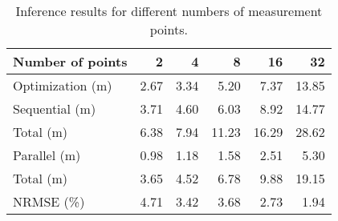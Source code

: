 \begin{table*}
  \centering
  \caption{Inference results for different numbers of measurement points.}
  \ttfamily
  \begin{tabular}{lrrrrr}
    \toprule
    \textnormal{Number of points} &    2 &    4 &     8 &    16 &    32 \\
    \midrule
    \textnormal{Optimization (m)} & 2.67 & 3.34 &  5.20 &  7.37 & 13.85 \\
    \midrule
    \textnormal{Sequential (m)}   & 3.71 & 4.60 &  6.03 &  8.92 & 14.77 \\
    \textnormal{Total (m)}        & 6.38 & 7.94 & 11.23 & 16.29 & 28.62 \\
    \midrule
    \textnormal{Parallel (m)}     & 0.98 & 1.18 &  1.58 &  2.51 &  5.30 \\
    \textnormal{Total (m)}        & 3.65 & 4.52 &  6.78 &  9.88 & 19.15 \\
    \midrule
    \textnormal{\ac{NRMSE} (\%)}  & 4.71 & 3.42 &  3.68 &  2.73 &  1.94 \\
    \bottomrule
  \end{tabular}
\end{table*}
